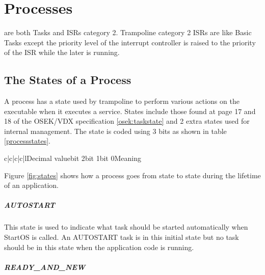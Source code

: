
\chapter{Processes}

 are both Tasks and ISRs category 2. Trampoline category 2 ISRs are like Basic Tasks except the priority level of the interrupt controller is raised to the priority of the ISR while the later is running.

\section{The States of a Process}

A process has a state used by trampoline to perform various actions on the executable when it executes a service. States include those found at page 17 and 18 of the OSEK/VDX specification \ref{osek:taskstate} and 2 extra states used for internal management. The state is coded using 3 bits as shown in table \ref{processstates}.

\begin{table}[htdp]
\caption{States of a process}
\begin{center}
\begin{longtablev}{c|c|c|c|l}{}{Decimal value}{bit 2}{bit 1}{bit 0}{Meaning}
\end{longtablev}
\end{center}
\label{processstates}
\end{table}%

Figure \ref{fig:states} shows how a process goes from state to state during the lifetime of an application.

\paragraph{AUTOSTART}

This state is used to indicate what task should be started automatically when StartOS is called. An AUTOSTART task is in this initial state but no task should be in this state when the application code is running.

\paragraph{READY\_AND\_NEW}

